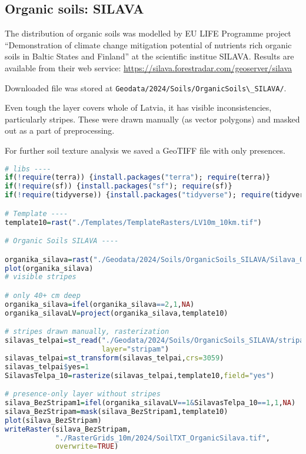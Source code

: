 \documentclass[
]{book}
\newcommand{\passthrough}[1]{#1}
\begin{document}
\subsection{Organic soils: SILAVA}\label{Ch04.07.05}

The distribution of organic soils was modelled by EU LIFE Programme project
``Demonstration of climate change mitigation potential of nutrients rich organic
soils in Baltic States and Finland'' at the scientific institue SILAVA. Results are
available from their web service: \url{https://silava.forestradar.com/geoserver/silava}

Downloaded file was stored at \passthrough{\lstinline!Geodata/2024/Soils/OrganicSoils\_SILAVA/!}.

Even tough the layer covers whole of Latvia, it has visible inconsistencies,
particularly stripes. These were drawn manually (as vector polygons) and masked
out as a part of preprocessing.

For further soil texture analysis we saved a GeoTIFF file with only presences.

\begin{lstlisting}[language=R]
# libs ----
if(!require(terra)) {install.packages("terra"); require(terra)}
if(!require(sf)) {install.packages("sf"); require(sf)}
if(!require(tidyverse)) {install.packages("tidyverse"); require(tidyverse)}

# Template ----
template10=rast("./Templates/TemplateRasters/LV10m_10km.tif")

# Organic Soils SILAVA ----

organika_silava=rast("./Geodata/2024/Soils/OrganicSoils_SILAVA/Silava_OrgSoils.tif")
plot(organika_silava)
# visible stripes

# only 40+ cm deep
organika_silava=ifel(organika_silava==2,1,NA)
organika_silavaLV=project(organika_silava,template10)

# stripes drawn manually, rasterization
silavas_telpai=st_read("./Geodata/2024/Soils/OrganicSoils_SILAVA/stripam.gpkg",
                       layer="stripam")
silavas_telpai=st_transform(silavas_telpai,crs=3059)
silavas_telpai$yes=1
SilavasTelpa_10=rasterize(silavas_telpai,template10,field="yes")

# presence-only layer without stripes
silava_BezStripam1=ifel(organika_silavaLV==1&SilavasTelpa_10==1,1,NA)
silava_BezStripam=mask(silava_BezStripam1,template10)
plot(silava_BezStripam)
writeRaster(silava_BezStripam,
            "./RasterGrids_10m/2024/SoilTXT_OrganicSilava.tif",
            overwrite=TRUE)
\end{lstlisting}
\end{document}
